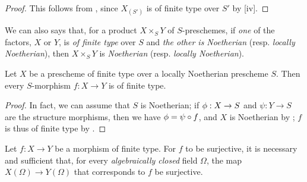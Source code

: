\begin{proof}
\label{proof-1.6.3.8}
This follows from , since $X_{(S')}$ is of finite type over $S'$ by [iv].
\end{proof}

We can also says that, for a product $X\times_S Y$ of $S$-preschemes, if \emph{one} of the factors, $X$ or $Y$, is \emph{of finite type} over $S$ and \emph{the other is Noetherian} (resp. \emph{locally Noetherian}), then $X\times_S Y$ is \emph{Noetherian} (resp. \emph{locally Noetherian}).

\begin{cor}[6.3.9]
\label{1.6.3.9}
Let $X$ be a prescheme of finite type over a locally Noetherian prescheme $S$.
Then every $S$-morphism $f:X\to Y$ is of finite type.
\end{cor}

\begin{proof}
\label{proof-1.6.3.9}
In fact, we can assume that $S$ is Noetherian;
if $\phi:X\to S$ and $\psi:Y\to S$ are the structure morphisms, then we have $\phi=\psi\circ f$, and $X$ is Noetherian by ;
$f$ is thus of finite type by .
\end{proof}

\begin{prop}[6.3.10]
\label{1.6.3.10}
Let $f:X\to Y$ be a morphism of finite type.
For $f$ to be surjective, it is necessary and sufficient that, for every \emph{algebraically closed} field $\Omega$, the map $X(\Omega)\to Y(\Omega)$ that corresponds to $f$  be surjective.
\end{prop}

